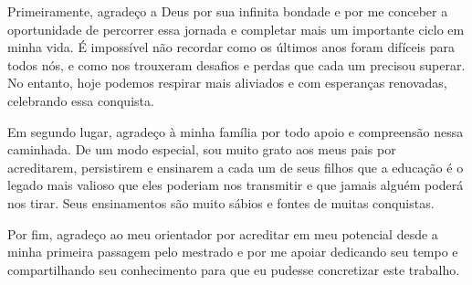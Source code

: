 \begin{agradecimentos}
    Primeiramente, agradeço a Deus por sua infinita bondade e por me conceber a oportunidade de percorrer essa jornada e completar mais um importante ciclo em minha vida.
    É impossível não recordar como os últimos anos foram difíceis para todos nós, e como nos trouxeram desafios e perdas que cada um precisou superar. 
    No entanto, hoje podemos respirar mais aliviados e com esperanças renovadas, celebrando essa conquista.
    
    Em segundo lugar, agradeço à minha família por todo apoio e compreensão nessa caminhada. De um modo especial, sou muito grato aos meus pais por acreditarem, persistirem e ensinarem a cada um de seus filhos que a educação é o legado mais valioso que eles poderiam nos transmitir e que jamais alguém poderá nos tirar.
    Seus ensinamentos são muito sábios e fontes de muitas conquistas.

    Por fim, agradeço ao meu orientador por acreditar em meu potencial desde a minha primeira passagem pelo mestrado e por me apoiar dedicando seu tempo e compartilhando seu conhecimento para que eu pudesse concretizar este trabalho.
\end{agradecimentos}